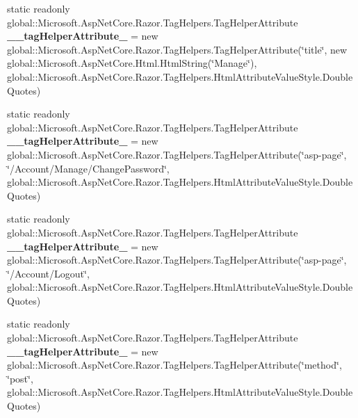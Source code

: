 \begin{DoxyCompactItemize}
\item 
\mbox{\label{class_asp_net_core_1_1_views___shared____sidebar_ad4bc5f87177e67d83988c7a23c86690a}} 
static readonly global\+::\+Microsoft.\+Asp\+Net\+Core.\+Razor.\+Tag\+Helpers.\+Tag\+Helper\+Attribute {\bfseries \+\_\+\+\_\+tag\+Helper\+Attribute\+\_} = new global\+::\+Microsoft.\+Asp\+Net\+Core.\+Razor.\+Tag\+Helpers.\+Tag\+Helper\+Attribute(\char`\"{}title\char`\"{}, new global\+::\+Microsoft.\+Asp\+Net\+Core.\+Html.\+Html\+String(\char`\"{}Manage\char`\"{}), global\+::\+Microsoft.\+Asp\+Net\+Core.\+Razor.\+Tag\+Helpers.\+Html\+Attribute\+Value\+Style.\+Double\+Quotes)
\item 
\mbox{\label{class_asp_net_core_1_1_views___shared____sidebar_ac68216b091d3e1648015e1d62b12a1aa}} 
static readonly global\+::\+Microsoft.\+Asp\+Net\+Core.\+Razor.\+Tag\+Helpers.\+Tag\+Helper\+Attribute {\bfseries \+\_\+\+\_\+tag\+Helper\+Attribute\+\_} = new global\+::\+Microsoft.\+Asp\+Net\+Core.\+Razor.\+Tag\+Helpers.\+Tag\+Helper\+Attribute(\char`\"{}asp-\/page\char`\"{}, \char`\"{}/Account/Manage/Change\+Password\char`\"{}, global\+::\+Microsoft.\+Asp\+Net\+Core.\+Razor.\+Tag\+Helpers.\+Html\+Attribute\+Value\+Style.\+Double\+Quotes)
\item 
\mbox{\label{class_asp_net_core_1_1_views___shared____sidebar_a1bda8e37fb4272e2a5ef1f81c88b8fe2}} 
static readonly global\+::\+Microsoft.\+Asp\+Net\+Core.\+Razor.\+Tag\+Helpers.\+Tag\+Helper\+Attribute {\bfseries \+\_\+\+\_\+tag\+Helper\+Attribute\+\_} = new global\+::\+Microsoft.\+Asp\+Net\+Core.\+Razor.\+Tag\+Helpers.\+Tag\+Helper\+Attribute(\char`\"{}asp-\/page\char`\"{}, \char`\"{}/Account/Logout\char`\"{}, global\+::\+Microsoft.\+Asp\+Net\+Core.\+Razor.\+Tag\+Helpers.\+Html\+Attribute\+Value\+Style.\+Double\+Quotes)
\item 
\mbox{\label{class_asp_net_core_1_1_views___shared____sidebar_afd9278359dcba22354c6e08cb0ee931d}} 
static readonly global\+::\+Microsoft.\+Asp\+Net\+Core.\+Razor.\+Tag\+Helpers.\+Tag\+Helper\+Attribute {\bfseries \+\_\+\+\_\+tag\+Helper\+Attribute\+\_} = new global\+::\+Microsoft.\+Asp\+Net\+Core.\+Razor.\+Tag\+Helpers.\+Tag\+Helper\+Attribute(\char`\"{}method\char`\"{}, \char`\"{}post\char`\"{}, global\+::\+Microsoft.\+Asp\+Net\+Core.\+Razor.\+Tag\+Helpers.\+Html\+Attribute\+Value\+Style.\+Double\+Quotes)

\end{DoxyCompactItemize}
